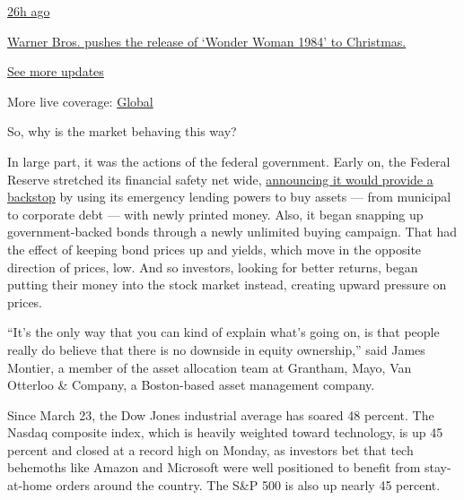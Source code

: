 \href{https://www.nytimes3xbfgragh.onion/live/2020/09/11/business/stock-market-today-coronavirus?action=click\&pgtype=Article\&state=default\&region=MAIN_CONTENT_1\&context=storylines_live_updates\#warner-bros-pushes-the-release-of-wonder-woman-1984-to-christmas}{26h
ago}

\href{https://www.nytimes3xbfgragh.onion/live/2020/09/11/business/stock-market-today-coronavirus?action=click\&pgtype=Article\&state=default\&region=MAIN_CONTENT_1\&context=storylines_live_updates\#warner-bros-pushes-the-release-of-wonder-woman-1984-to-christmas}{Warner
Bros. pushes the release of `Wonder Woman 1984' to Christmas.}

\href{https://www.nytimes3xbfgragh.onion/live/2020/09/11/business/stock-market-today-coronavirus?action=click\&pgtype=Article\&state=default\&region=MAIN_CONTENT_1\&context=storylines_live_updates}{See
more updates}

More live coverage:
\href{https://www.nytimes3xbfgragh.onion/2020/09/11/world/covid-19-coronavirus.html?action=click\&pgtype=Article\&state=default\&region=MAIN_CONTENT_1\&context=storylines_live_updates}{Global}

So, why is the market behaving this way?

In large part, it was the actions of the federal government. Early on,
the Federal Reserve stretched its financial safety net wide,
\href{https://www.nytimes3xbfgragh.onion/2020/05/19/business/too-big-to-fail-wall-street-businesses.html}{announcing
it would provide a backstop} by using its emergency lending powers to
buy assets --- from municipal to corporate debt --- with newly printed
money. Also, it began snapping up government-backed bonds through a
newly unlimited buying campaign. That had the effect of keeping bond
prices up and yields, which move in the opposite direction of prices,
low. And so investors, looking for better returns, began putting their
money into the stock market instead, creating upward pressure on prices.

``It's the only way that you can kind of explain what's going on, is
that people really do believe that there is no downside in equity
ownership,'' said James Montier, a member of the asset allocation team
at Grantham, Mayo, Van Otterloo \& Company, a Boston-based asset
management company.

Since March 23, the Dow Jones industrial average has soared 48 percent.
The Nasdaq composite index, which is heavily weighted toward technology,
is up 45 percent and closed at a record high on Monday, as investors bet
that tech behemoths like Amazon and Microsoft were well positioned to
benefit from stay-at-home orders around the country. The S\&P 500 is
also up nearly 45 percent.

